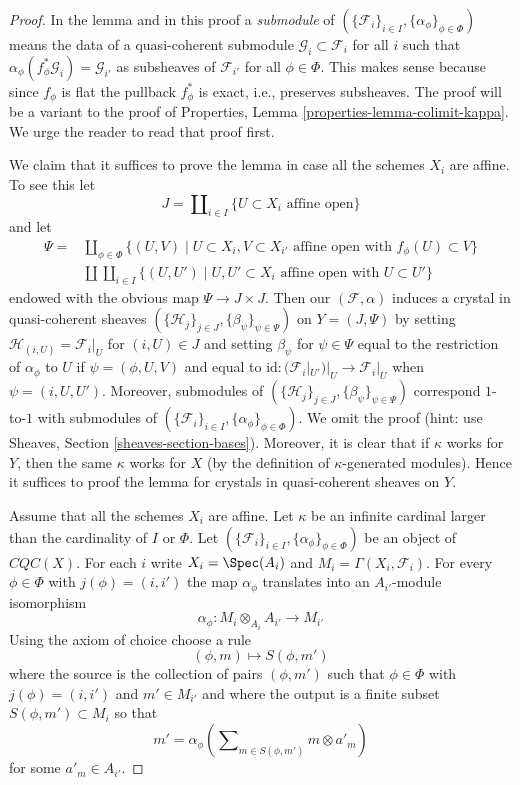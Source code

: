 \begin{proof}
In the lemma and in this proof a {\it submodule} of
$(\{\mathcal{F}_i\}_{i \in I}, \{\alpha_\phi\}_{\phi \in \Phi})$
means the data of a quasi-coherent submodule
$\mathcal{G}_i \subset \mathcal{F}_i$ for all $i$ such that
$\alpha_\phi(f_\phi^*\mathcal{G}_i) = \mathcal{G}_{i'}$
as subsheaves of $\mathcal{F}_{i'}$ for all $\phi \in \Phi$.
This makes sense because since $f_\phi$ is flat the
pullback $f^*_\phi$ is exact, i.e., preserves subsheaves.
The proof will be a variant to the proof of
Properties, Lemma \ref{properties-lemma-colimit-kappa}.
We urge the reader to read that proof first.

\medskip\noindent
We claim that it suffices to prove the lemma in case all the schemes
$X_i$ are affine. To see this let
$$
J = \coprod\nolimits_{i \in I} \{U \subset X_i\text{ affine open}\}
$$
and let
\begin{align*}
\Psi = & \coprod\nolimits_{\phi \in \Phi}
\{
(U, V) \mid
U \subset X_i, V \subset X_{i'}\text{ affine open with } f_\phi(U) \subset V
\} \\
&
\coprod \coprod\nolimits_{i \in I}
\{
(U, U') \mid
U, U' \subset X_i\text{ affine open with } U \subset U'
\}
\end{align*}
endowed with the obvious map $\Psi \to J \times J$. Then our
$(\mathcal{F}, \alpha)$ induces a crystal in quasi-coherent sheaves
$(\{\mathcal{H}_j\}_{j \in J}, \{\beta_\psi\}_{\psi \in \Psi})$
on $Y = (J, \Psi)$ by setting $\mathcal{H}_{(i, U)} = \mathcal{F}_i|_U$
for $(i, U) \in J$ and setting $\beta_\psi$ for $\psi \in \Psi$
equal to the restriction of $\alpha_\phi$ to $U$
if $\psi = (\phi, U, V)$ and
equal to $\text{id} : (\mathcal{F}_i|_{U'})|_U \to \mathcal{F}_i|_U$
when $\psi = (i, U, U')$. Moreover, submodules of
$(\{\mathcal{H}_j\}_{j \in J}, \{\beta_\psi\}_{\psi \in \Psi})$
correspond $1$-to-$1$ with submodules of
$(\{\mathcal{F}_i\}_{i \in I}, \{\alpha_\phi\}_{\phi \in \Phi})$.
We omit the proof (hint: use
Sheaves, Section \ref{sheaves-section-bases}).
Moreover, it is clear that if $\kappa$ works for $Y$, then
the same $\kappa$ works for $X$ (by the definition of $\kappa$-generated
modules). Hence it suffices to proof the lemma for crystals in
quasi-coherent sheaves on $Y$.

\medskip\noindent
Assume that all the schemes $X_i$ are affine. Let $\kappa$ be an infinite
cardinal larger than the cardinality of $I$ or $\Phi$. Let
$(\{\mathcal{F}_i\}_{i \in I}, \{\alpha_\phi\}_{\phi \in \Phi})$
be an object of $\textit{CQC}(X)$. For each $i$ write
$X_i = \Spec(A_i)$ and $M_i = \Gamma(X_i, \mathcal{F}_i)$.
For every $\phi \in \Phi$ with $j(\phi) = (i, i')$ the map
$\alpha_\phi$ translates into an $A_{i'}$-module isomorphism
$$
\alpha_\phi : M_i \otimes_{A_i} A_{i'} \longrightarrow M_{i'}
$$
Using the axiom of choice choose a rule
$$
(\phi, m) \longmapsto S(\phi, m')
$$
where the source is the collection of pairs $(\phi, m')$ such that
$\phi \in \Phi$ with $j(\phi) = (i, i')$ and $m' \in M_{i'}$ and
where the output is a finite subset $S(\phi, m') \subset M_i$ so that
$$
m' = \alpha_\phi\left(\sum\nolimits_{m \in S(\phi, m')} m \otimes a'_m\right)
$$
for some $a'_m \in A_{i'}$.


\end{proof}
